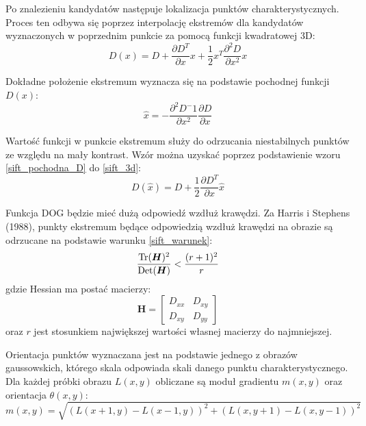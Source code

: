 Po znalezieniu kandydatów następuje lokalizacja punktów charakterystycznych. Proces ten odbywa się poprzez interpolację ekstremów dla kandydatów wyznaczonych w poprzednim punkcie za pomocą funkcji kwadratowej 3D:
\begin{equation} 
\label{sift_3d} 
D(x) = D + \frac{\partial D^T}{\partial x} x + \frac{1}{2}x^T \frac{\partial^2 D}{\partial x^2} x
\end{equation}

Dokładne położenie ekstremum wyznacza się na podstawie pochodnej funkcji $D(x)$:
\begin{equation} 
\label{sift_pochodna_D} 
\hat{x} = -\frac{\partial^2 D^-1}{\partial x^2}\frac{\partial D}{\partial x}
\end{equation}

Wartość funkcji w punkcie ekstremum służy do odrzucania niestabilnych punktów ze względu na mały kontrast. Wzór można uzyskać poprzez podstawienie wzoru \ref{sift_pochodna_D} do \ref{sift_3d}:
\begin{equation} 
\label{sift_Dx} 
D(\hat{x}) = D + \frac{1}{2} \frac{\partial D^T}{\partial x} \hat{x}
\end{equation}

Funkcja DOG będzie mieć dużą odpowiedź wzdłuż krawędzi. Za Harris i Stephens (1988), punkty ekstremum będące odpowiedzią wzdłuż krawędzi na obrazie są odrzucane na podstawie warunku \ref{sift_warunek}:
\begin{equation} 
\label{sift_warunek} 
\frac{\operatorname{Tr}(\boldsymbol{H})^2}{\operatorname{Det}(\boldsymbol{H})} < \frac{(r+1)^2}{r}
\end{equation} gdzie Hessian ma postać macierzy:
\begin{equation} 
\label{sift_hessian} 
\boldsymbol{H} = 
	\begin{bmatrix}
		D_{xx} & D_{xy} \\
		D_{xy} & D_{yy}
	\end{bmatrix}
\end{equation} oraz $r$ jest stosunkiem największej wartości własnej macierzy do najmniejszej.

Orientacja punktów wyznaczana jest na podstawie jednego z obrazów gaussowskich, którego skala odpowiada skali danego punktu charakterystycznego. Dla każdej próbki obrazu $L(x, y)$ obliczane są moduł gradientu $m(x, y)$ oraz orientacja $\theta(x, y)$:
\begin{equation} 
\label{sift_gradient_magnitude} 
m(x, y) = \sqrt{(L(x + 1, y) - L(x - 1, y))^2 + (L(x, y + 1) - L(x, y - 1))^2}
\end{equation}

